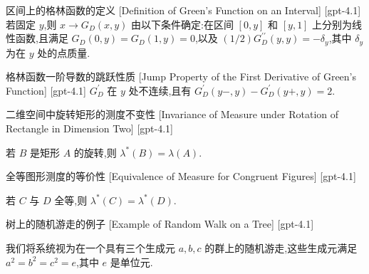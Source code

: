 \documentclass[UTF8]{ctexart}
\begin{document}
    
    
    \begin{dfn}
        {区间上的格林函数的定义}
        [Definition of Green's Function on an Interval]
        [gpt-4.1]
        若固定 $y$,则 $x \to G_{D}(x, y)$ 由以下条件确定:在区间 $[0, y]$ 和 $[y, 1]$ 上分别为线性函数,且满足 $G_{D}(0, y) = G_{D}(1, y) = 0$,以及 $(1/2) G_{D}^{\prime\prime}(y, y) = -\delta_{y}$,其中 $\delta_{y}$ 为在 $y$ 处的点质量.

    \end{dfn}
    
    
    
    \begin{ppt}
        {格林函数一阶导数的跳跃性质}
        [Jump Property of the First Derivative of Green's Function]
        [gpt-4.1]
        $G_{D}^{\prime}$ 在 $y$ 处不连续,且有 $G_{D}^{\prime}(y-, y) - G_{D}^{\prime}(y+, y) = 2$.

    \end{ppt}
    
    
    
    \begin{thm}
        {二维空间中旋转矩形的测度不变性}
        [Invariance of Measure under Rotation of Rectangle in Dimension Two]
        [gpt-4.1]
        
若 $B$ 是矩形 $A$ 的旋转,则 $\lambda^{*}(B) = \lambda(A)$.

    \end{thm}
    
    
    
    \begin{thm}
        {全等图形测度的等价性}
        [Equivalence of Measure for Congruent Figures]
        [gpt-4.1]
        
若 $C$ 与 $D$ 全等,则 $\lambda^{*}(C) = \lambda^{*}(D)$.

    \end{thm}
    
    
    
    \begin{xmp}
        {树上的随机游走的例子}
        [Example of Random Walk on a Tree]
        [gpt-4.1]
        
我们将系统视为在一个具有三个生成元 $a, b, c$ 的群上的随机游走,这些生成元满足 $a^{2} = b^{2} = c^{2} = e$,其中 $e$ 是单位元.

    \end{xmp}
    
\end{document}
